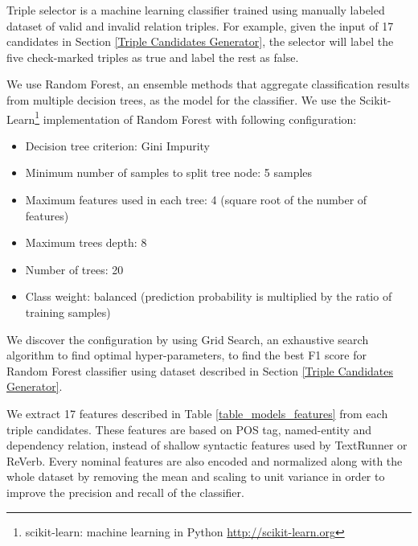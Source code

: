 \documentclass[conference,compsoc,12pt]{IEEEtran}
\begin{document}
Triple selector is a machine learning classifier trained using manually labeled dataset of valid and invalid relation triples. For example, given the input of 17 candidates in Section \ref{Triple Candidates Generator}, the selector will label the five check-marked triples as true and label the rest as false.

We use Random Forest\cite{breiman2001random}, an ensemble methods that aggregate classification results from multiple decision trees, as the model for the classifier. We use the Scikit-Learn\footnote{scikit-learn: machine learning in Python \url{http://scikit-learn.org}} implementation of Random Forest with following configuration:

\begin{itemize}
\item Decision tree criterion: Gini Impurity
\item Minimum number of samples to split tree node: 5 samples
\item Maximum features used in each tree: 4 (square root of the number of features)
\item Maximum trees depth: 8
\item Number of trees: 20
\item Class weight: balanced (prediction probability is multiplied by the ratio of training samples)
\end{itemize}

We discover the configuration by using Grid Search\cite{wasserman2015grid}, an exhaustive search algorithm to find optimal hyper-parameters, to find the best F1 score for Random Forest classifier using dataset described in Section \ref{Triple Candidates Generator}. 

We extract 17 features described in Table \ref{table_models_features} from each triple candidates. These features are based on POS tag, named-entity and dependency relation, instead of shallow syntactic features used by TextRunner or ReVerb\cite{banko2007open}\cite{etzioni2011open}. Every nominal features are also encoded and normalized along with the whole dataset by removing the mean and scaling to unit variance in order to improve the precision and recall of the classifier.
\end{document}
